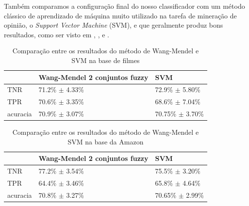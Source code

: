 \documentclass[template.tex]{subfiles}
\begin{document}
Também comparamos a configuração final do nosso classificador com um método clássico de aprendizado de máquina muito utilizado na tarefa de mineração de opinião, o \textit{Support Vector Machine} (SVM), e que geralmente produz bons resultados, como ser visto em \cite{moraes2012document}, \cite{pang2002thumbs}, \cite{pang2004sentimental} e \cite{wilson2004just}. 

\begin{table}[!h]
    \begin{tabular}{lll}
    ~                   & Wang-Mendel 2 conjuntos fuzzy                     & SVM \\ \hline
    TNR                 & 71.2\% $\pm$ 4.33\%                                           & 72.9\% $\pm$ 5.80\%    \\
    TPR             & 70.6\% $\pm$ 3.35\%                                       & 68.6\% $\pm$ 7.04\%   \\
    acuracia        & 70.9\% $\pm$ 3.07\%                                       & 70.75\% $\pm$ 3.70\%    \\
    \end{tabular}
    \caption{Comparação entre os resultados do método de Wang-Mendel e SVM na base de filmes}
    \label{table:movies_svm}
\end{table}

%
%
%

\begin{table}[!h]
    \begin{tabular}{lll}
    ~                       & Wang-Mendel 2 conjuntos fuzzy                             & SVM \\ \hline
    TNR                     & 77.2\% $\pm$ 3.54\%                                               & 75.5\% $\pm$ 3.20\%    \\
    TPR                 & 64.4\% $\pm$ 3.46\%                                               & 65.8\% $\pm$ 4.64\%   \\
    acuracia           & 70.8\% $\pm$ 3.27\%                                            & 70.65\% $\pm$ 2.99\%    \\
    \end{tabular}
    \caption{Comparação entre os resultados do método de Wang-Mendel e SVM na base da Amazon}
    \label{table:amazon_svm}
\end{table}
\end{document}
